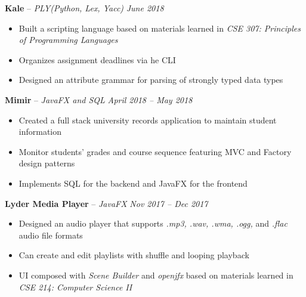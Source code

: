 \documentclass[11pt,letterpaper]{article}
\begin{document}
\spacedhrule{0.2em}{-0.8em} 



\headedsection 
{\textbf{Kale} -- \textit{PLY(Python, Lex, Yacc)}}
{\textit{June 2018}} {
		\begin{itemize}[noitemsep,nolistsep]
	\item Built a scripting language based on materials learned in \textit{CSE 307: Principles of Programming Languages}
	\item Organizes assignment deadlines via he CLI
	\item Designed an attribute grammar for parsing of strongly typed data types
\end{itemize}
}


\headedsection 
{\textbf{Mimir} -- \textit{JavaFX and SQL}}
{\textit{April 2018 -- May 2018}} {
\begin{itemize}[noitemsep,nolistsep]
	\item Created a full stack university records application to maintain student information
	\item Monitor students' grades and course sequence featuring MVC and Factory design patterns
	\item Implements SQL for the backend and JavaFX for the frontend
\end{itemize}
}


\headedsection 
{\textbf{Lyder Media Player} -- \textit{JavaFX}}
{\textit{Nov 2017 -- Dec 2017}} {
\begin{itemize}[noitemsep,nolistsep]
	\item Designed an audio player that supports \textit{.mp3, .wav, .wma, .ogg,} and \textit{.flac}  audio file formats
	\item Can create and edit playlists with shuffle and looping playback
	\item UI composed with \textit{Scene Builder} and \textit{openjfx} based on materials learned in \textit{CSE 214: Computer Science II}
\end{itemize}
}
\end{document}
